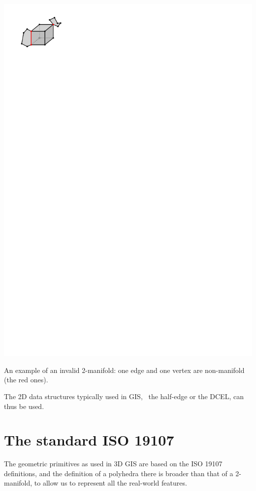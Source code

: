 \begin{marginfigure}
  \centering
  \includegraphics[width=0.9\linewidth]{figs/nonmanifold}
  \caption{An example of an invalid 2-manifold: one edge and one vertex are non-manifold (the red ones).}%
\label{fig:nonmanifold}
\end{marginfigure}
The 2D data structures typically used in GIS, \eg\ the half-edge or the DCEL, can thus be used.



%
\section{The standard ISO 19107}

The geometric primitives as used in 3D GIS are based on the ISO 19107 definitions, and the definition of a polyhedra there is broader than that of a 2-manifold, to allow us to represent all the real-world features.

